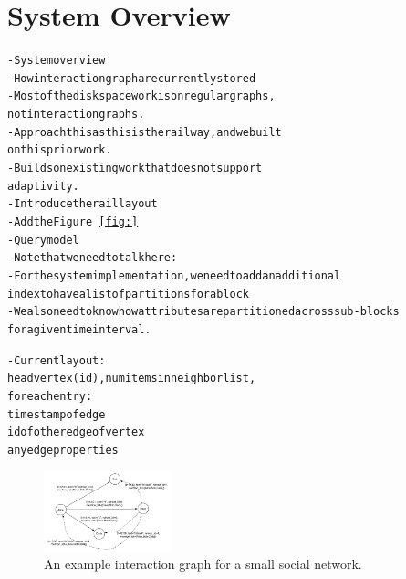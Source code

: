 \section{System Overview}\label{sec:system}
\begin{alltt}\scriptsize
- System overview
    - How interaction graph are currently stored
        - Most of the disk space work is on regular graphs, 
           not interaction graphs. 
        - Approach this as this is the railway, and we built
           on this prior work.
        - Builds on existing work that does not support 
          adaptivity.
    - Introduce the rail layout
    - Add the Figure~\ref{fig:}
    - Query model
   - Note that we need to talk here:
    - For the system implementation, we need to add an additional
       index to have a list of partitions for a block
   - We also need to know how attributes are partitioned across sub-blocks 
      for a given time interval.

    - Current layout:
    head vertex (id), num items in neighbor list, 
    for each entry:
        timestamp of edge
        id of other edge of vertex
        any edge properties

\end{alltt}


\begin{figure}[ht!]
\includegraphics[width=0.33\textwidth]{figures/example_interaction.pdf} 
 \caption{An example interaction graph for a small social network.}
 \label{fig:example}
 \end{figure}
